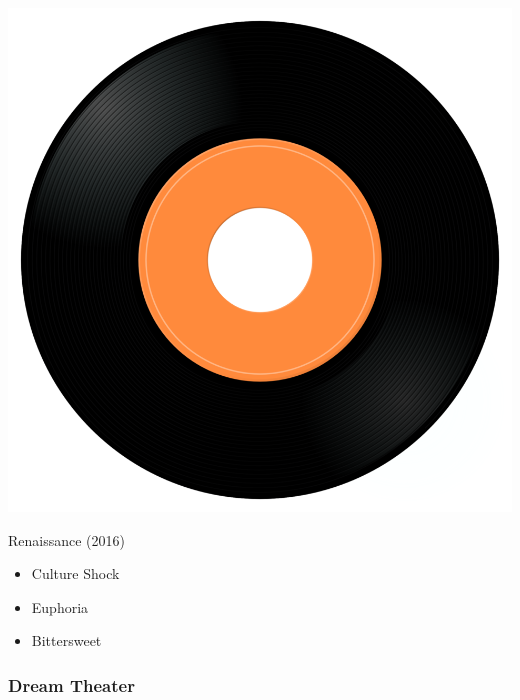 \begin{minipage}[t]{0.25\textwidth}
\captionsetup{type=figure}
\includegraphics[width=\textwidth]{Images/cover.png}
\caption*{Renaissance (2016)}
\end{minipage}
\begin{minipage}[t]{0.25\textwidth}\vspace{0pt}
\begin{itemize}[nosep,leftmargin=1em,labelwidth=*,align=left]
	\setlength{\itemsep}{0pt}
	\item Culture Shock
	\item Euphoria
	\item Bittersweet
\end{itemize}
\end{minipage}

\subsubsection{Dream Theater}

